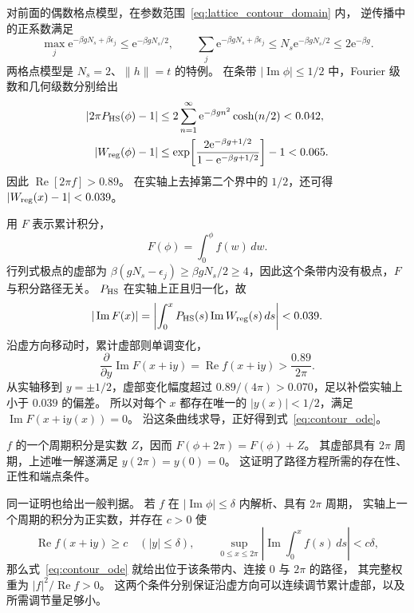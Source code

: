 \documentclass[UTF8,11pt,a4paper,fontset=fandol]{ctexart}
\newcommand{\ee}{\mathrm e}
\newcommand{\ii}{\mathrm i}
\numberwithin{equation}{section}
\begin{document}
对前面的偶数格点模型，在参数范围~\eqref{eq:lattice_contour_domain} 内，
逆传播中的正系数满足
\begin{equation}
 \max_j\ee^{-\beta gN_s+\beta\epsilon_j}\le\ee^{-\beta gN_s/2},
 \qquad
 \sum_j\ee^{-\beta gN_s+\beta\epsilon_j}
 \le N_s\ee^{-\beta gN_s/2}\le2\ee^{-\beta g}.
\end{equation}
两格点模型是 $N_s=2$、$\|h\|=t$ 的特例。
在条带 $|\operatorname{Im}\phi|\le1/2$ 中，Fourier 级数和几何级数分别给出
\begin{align}
 |2\pi P_{\rm HS}(\phi)-1|
 &\le2\sum_{n=1}^{\infty}\ee^{-\beta g n^2}\cosh(n/2)<0.042,\\
 |W_{\rm reg}(\phi)-1|
 &\le\exp\!\left[
 \frac{2\ee^{-\beta g+1/2}}{1-\ee^{-\beta g+1/2}}
 \right]-1<0.065.
 \label{eq:strip_bounds}
\end{align}
因此 $\operatorname{Re}[2\pi f]>0.89$。
在实轴上去掉第二个界中的 $1/2$，还可得
$|W_{\rm reg}(x)-1|<0.039$。

用 $F$ 表示累计积分，
\begin{equation}
 F(\phi)=\int_0^\phi f(w)\,dw.
\end{equation}
行列式极点的虚部为 $\beta(gN_s-\epsilon_j)\ge\beta gN_s/2\ge4$，因此这个条带内没有极点，$F$ 与积分路径无关。
$P_{\rm HS}$ 在实轴上正且归一化，故
\begin{equation}
 |\operatorname{Im}F(x)|
 =\left|\int_0^x P_{\rm HS}(s)\operatorname{Im}W_{\rm reg}(s)\,ds\right|
 <0.039.
\end{equation}
沿虚方向移动时，累计虚部则单调变化，
\begin{equation}
 \frac{\partial}{\partial y}\operatorname{Im}F(x+\ii y)
 =\operatorname{Re}f(x+\ii y)>\frac{0.89}{2\pi}.
\end{equation}
从实轴移到 $y=\pm1/2$，虚部变化幅度超过
$0.89/(4\pi)>0.070$，足以补偿实轴上小于 $0.039$ 的偏差。
所以对每个 $x$ 都存在唯一的 $|y(x)|<1/2$，满足
$\operatorname{Im}F(x+\ii y(x))=0$。
沿这条曲线求导，正好得到式~\eqref{eq:contour_ode}。

$f$ 的一个周期积分是实数 $Z$，因而
$F(\phi+2\pi)=F(\phi)+Z$。
其虚部具有 $2\pi$ 周期，上述唯一解遂满足
$y(2\pi)=y(0)=0$。
这证明了路径方程所需的存在性、正性和端点条件。

同一证明也给出一般判据。
若 $f$ 在 $|\operatorname{Im}\phi|\le\delta$ 内解析、具有 $2\pi$ 周期，
实轴上一个周期的积分为正实数，并存在 $c>0$ 使
\begin{equation}
 \operatorname{Re}f(x+\ii y)\ge c
 \quad (|y|\le\delta),\qquad
 \sup_{0\le x\le2\pi}
 \left|\operatorname{Im}\int_0^x f(s)\,ds\right|<c\delta,
 \label{eq:contour_criterion}
\end{equation}
那么式~\eqref{eq:contour_ode} 就给出位于该条带内、连接 $0$ 与 $2\pi$ 的路径，
其完整权重为 $|f|^2/\operatorname{Re}f>0$。
这两个条件分别保证沿虚方向可以连续调节累计虚部，以及所需调节量足够小。
\end{document}
